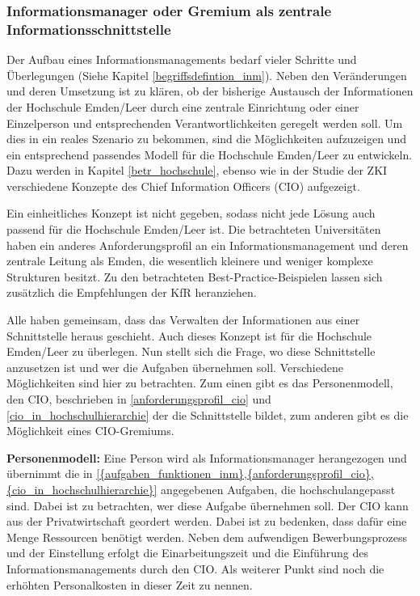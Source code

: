 \subsubsection{Informationsmanager oder Gremium als zentrale Informationsschnittstelle}
\label{subsubsection_cio_gremium}

Der Aufbau eines Informationsmanagements bedarf vieler Schritte und Überlegungen (Siehe Kapitel \ref{begriffsdefintion_inm}). Neben den Veränderungen und deren Umsetzung ist zu klären, ob der bisherige Austausch der Informationen der Hochschule Emden/Leer durch eine zentrale Einrichtung oder einer Einzelperson und entsprechenden Verantwortlichkeiten geregelt werden soll. Um dies in ein reales Szenario zu bekommen, sind die Möglichkeiten aufzuzeigen und ein entsprechend passendes Modell für die Hochschule Emden/Leer zu entwickeln. Dazu werden in Kapitel  \ref{betr_hochschule}, ebenso wie in der Studie der ZKI verschiedene Konzepte des Chief Information Officers (CIO) aufgezeigt.


Ein einheitliches Konzept ist nicht gegeben, sodass nicht jede Lösung auch passend für die Hochschule Emden/Leer ist. Die betrachteten Universitäten haben ein anderes Anforderungsprofil an ein Informationsmanagement und deren zentrale Leitung als Emden, die wesentlich kleinere und weniger komplexe Strukturen besitzt. Zu den betrachteten Best-Practice-Beispielen lassen sich zusätzlich die Empfehlungen der KfR heranziehen. 

Alle haben gemeinsam, dass das Verwalten der Informationen aus einer Schnittstelle heraus geschieht. Auch dieses Konzept ist für die Hochschule Emden/Leer zu überlegen. Nun stellt sich die Frage, wo diese Schnittstelle anzusetzen ist und wer die Aufgaben übernehmen soll. Verschiedene Möglichkeiten sind hier zu betrachten. Zum einen gibt es das Personenmodell, den CIO, beschrieben in \ref{anforderungsprofil_cio} und \ref{cio_in_hochschulhierarchie} der die Schnittstelle bildet, zum anderen gibt es die Möglichkeit eines CIO-Gremiums. 


\textbf{Personenmodell:\newline}
Eine Person wird als Informationsmanager herangezogen und übernimmt die in \ref{{aufgaben_funktionen_inm},{anforderungsprofil_cio}, {cio_in_hochschulhierarchie}} angegebenen Aufgaben, die hochschulangepasst sind. Dabei ist zu betrachten, wer diese Aufgabe übernehmen soll. Der CIO kann aus der Privatwirtschaft geordert werden. Dabei ist zu bedenken, dass dafür eine Menge Ressourcen benötigt werden. Neben dem aufwendigen Bewerbungsprozess und der Einstellung erfolgt die Einarbeitungszeit und die Einführung des Informationsmanagements durch den CIO. Als weiterer Punkt sind noch die erhöhten Personalkosten in dieser Zeit zu nennen.

